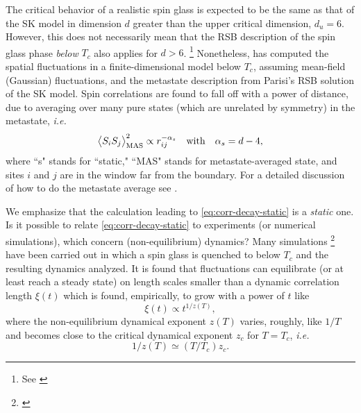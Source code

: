 The critical behavior of a realistic spin glass is expected to be the same as
that of the SK model in dimension $d$ greater than the upper critical
dimension, $d_u=6$. However, this does not necessarily mean that the RSB
description of the spin glass phase \emph{below} $T_c$ also applies for $d>6$.%
\footnote{%
  See
  \textcite{%
    newman1997metastate,%
    fisher1987absence,%
    fisher1988equilibrium,%
    moore2011disappearance%
  }
}
Nonetheless, \textcite{read2014short} has computed the spatial fluctuations in a
finite-dimensional model below $T_c$, assuming mean-field (Gaussian) fluctuations,
and the metastate description from Parisi's RSB solution of the SK model. Spin
correlations are found to fall off with a power of distance, due to averaging
over many pure states (which are unrelated by symmetry) in the metastate, \emph{i.e.}
\begin{equation}
  \left< S_i S_j \right>_{\mathrm{MAS}}^2 \propto r_{ij}^{-\alpha_s}
  \quad\text{with}\quad
  \alpha_s = d - 4,
  \label{eq:corr-decay-static}
\end{equation}
where ``s" stands for ``static," ``MAS" stands for metastate-averaged state,
and sites $i$ and $j$ are in the window far from the boundary. For a detailed
discussion of how to do the metastate average see \textcite{read2014short}.

We emphasize that the calculation leading to \cref{eq:corr-decay-static}
is a \emph{static} one.
Is it possible to relate \cref{eq:corr-decay-static} to experiments (or
numerical simulations), which concern (non-equilibrium) dynamics?
Many simulations%
\footnote{%
  \textcite{%
    manssen2015aging,%
    rieger1993nonequilibrium,%
    marinari1996numerical%
  }
}
have been carried out in which a spin glass is quenched to below $T_c$ and the
resulting dynamics analyzed. It is found that fluctuations can equilibrate (or
at least reach a steady state) on length scales smaller than a dynamic
correlation length $\xi(t)$ which is found, empirically, to grow with a power
of $t$ like
\begin{equation}
  \xi(t) \propto t^{1/z(T)},
  \label{eq:xi-scaling}
\end{equation}
where the non-equilibrium dynamical exponent $z(T)$ varies, roughly, like $1/T$
and becomes close to the critical dynamical exponent $z_c$ for $T=T_c$,
\textit{i.e.}
\begin{equation}
  1/z(T) \simeq (T/T_c) z_c.
\end{equation}

